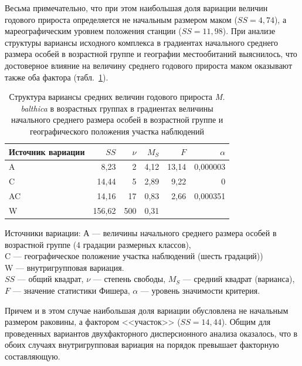 Весьма примечательно, что при этом наибольшая доля вариации величин годового прироста определяется не начальным размером маком ($SS = 4,74$), а мареографическим уровнем положения станции ($SS = 11,98$).
При анализе структуры вариансы исходного комплекса в градиентах начального среднего размера особей в возрастной группе и географии местообитаний выяснилось, что достоверное влияние на величину среднего годового прироста маком оказывают также оба фактора (табл.~\ref{tab:prirost_ANOVA_geography}).
\begin{table}[h]
    \caption{Структура вариансы средних величин годового прироста {\it M. balthica} в возрастных группах в градиентах величины начального среднего размера особей в возрастной группе и географического положения участка наблюдений}
    \label{tab:prirost_ANOVA_geography}
    \begin{center}
    \begin{tabular}{|l|rrrrr|}
        \hline
    Источник вариации & $SS$   & $\nu$   & $M_S$   & $F$     & $\alpha$     \\ \hline
        A                 & 8,23   & 2   & 4,12 & 13,14 & 0,000003 \\
        C                 & 14,44  & 5   & 2,89 & 9,22  & 0        \\
        AC                & 14,16  & 17  & 0,83 & 2,66  & 0,000351 \\
        W                 & 156,62 & 500 & 0,31 &       &         \\ \hline
    \end{tabular}
\end{center}

    \footnotesize{Источники вариации: А --- величины начального среднего размера особей в возрастной группе (4 градации размерных классов),\\ 
        C --- географическое положение участка наблюдений (шесть градаций))\\
    W --- внутригрупповая вариация.\\
    $SS$ --- общий квадрат, $\nu$ --- степень свободы, $M_S$ --- средний квадрат (варианса), $F$ --- значение статистики Фишера, $\alpha$ --- уровень значимости критерия.}
\end{table}
Причем и в этом случае наибольшая доля вариации обусловлена не начальным размером раковины, а фактором <<участок>> ($SS = 14,44$).
Общим для проведенных вариантов двухфакторного дисперсионного анализа оказалось, что в обоих случаях внутригрупповая вариация на порядок превышает факторную составляющую. 
